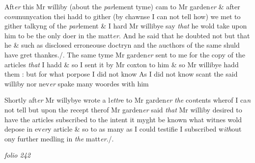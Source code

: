 \documentclass[12pt, a4paper]{book}
\begin{document}
            		
		\ifthenelse{\isodd{\thepage}}
		{\reversemarginpar}
		{\normalmarginpar}
		Aft\textit{er} this Mr williby (about the \textit{par}lement tyme) cam to Mr garden\textit{er} \& after
co\textit{m}munycation thei hadd to gither (by chawnse I can not tell how) we
met to gither talkyng of the \textit{par}lement \& I hard Mr willibye say \textit{that} he
wold take upon him to be the only doer in the matt\textit{er}. And he said that 
he doubted not but that he \& such as disclosed erroneouse doctryn and
the aucthors of the same shuld have gret thankes./. The same tyme
Mr garden\textit{er} sent to me for the copy of the articles \textit{that} I hadd \& so I sent it
by Mr coxton to him \& so Mr willibye hadd them : but for what porpose I
did not know As I did not know scant the said williby nor nev\textit{er} spake
many woordes with him
            		
		\ifthenelse{\isodd{\thepage}}
		{\reversemarginpar}
		{\normalmarginpar}
		Shortly aft\textit{er} Mr willybye wrote a l\textit{ettr}e to Mr garden\textit{er}
               \textit{the} co\textit{n}tents wherof I ca\textit{n}
not tell but upon the recept therof Mr garden\textit{er} said \textit{that} Mr williby desired
to have the articles subscribed to the intent it myght be known what
witnes wold depose in ev\textit{er}y article \& so to as many as I could testifie
I subscribed w\textit{ith}out ony further medling in \textit{the} matt\textit{er}./.

\dotfill
						\newpage
{}

\textit{folio 242}
\end{document}
